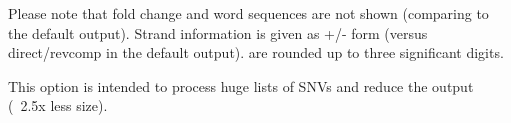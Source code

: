 Please note that fold change and word sequences are not shown (comparing to the default output).
Strand information is given as +/- form (versus direct/revcomp in the default output).
\pvalues are rounded up to three significant digits.

This option is intended to process huge lists of SNVs and reduce the output (~2.5x less size).
